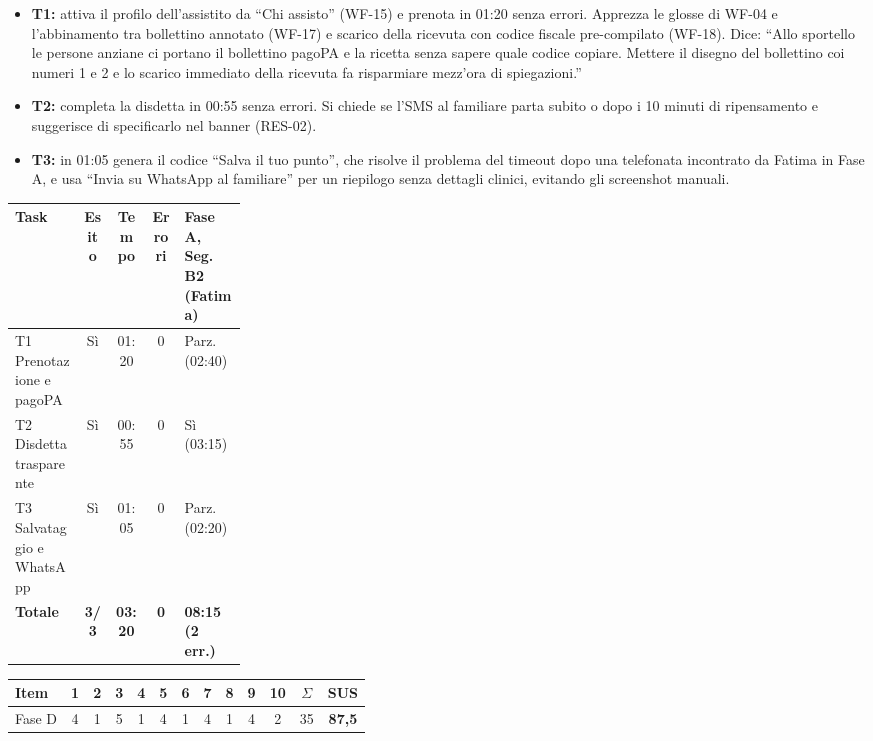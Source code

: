 
\begin{itemize}
\item \textbf{T1:} attiva il profilo dell'assistito da ``Chi assisto'' (WF-15) e prenota in 01:20 senza errori. Apprezza le glosse di WF-04 e l'abbinamento tra bollettino annotato (WF-17) e scarico della ricevuta con codice fiscale pre-compilato (WF-18). Dice: \enquote{Allo sportello le persone anziane ci portano il bollettino pagoPA e la ricetta senza sapere quale codice copiare. Mettere il disegno del bollettino coi numeri 1 e 2 e lo scarico immediato della ricevuta fa risparmiare mezz'ora di spiegazioni.}
\item \textbf{T2:} completa la disdetta in 00:55 senza errori. Si chiede se l'SMS al familiare parta subito o dopo i 10 minuti di ripensamento e suggerisce di specificarlo nel banner (RES-02).
\item \textbf{T3:} in 01:05 genera il codice ``Salva il tuo punto'', che risolve il problema del timeout dopo una telefonata incontrato da Fatima in Fase A, e usa ``Invia su WhatsApp al familiare'' per un riepilogo senza dettagli clinici, evitando gli screenshot manuali.
\end{itemize}

\begin{center}
\label{tab:d-test-laura}
\footnotesize
\begin{tabularx}{\linewidth}{@{}>{\raggedright\arraybackslash}X c c c >{\centering\arraybackslash}p{0.27\linewidth}@{}}
\toprule
\textbf{Task} & \textbf{Esito} & \textbf{Tempo} & \textbf{Errori} & \textbf{Fase A, Seg. B2 (Fatima)} \\
\midrule
T1 Prenotazione e pagoPA & Sì & 01:20 & 0 & Parz. (02:40) \\
T2 Disdetta trasparente & Sì & 00:55 & 0 & Sì (03:15) \\
T3 Salvataggio e WhatsApp & Sì & 01:05 & 0 & Parz. (02:20) \\
\midrule
\textbf{Totale} & \textbf{3/3} & \textbf{03:20} & \textbf{0} & \textbf{08:15 (2 err.)} \\
\bottomrule
\end{tabularx}
\end{center}

\begin{center}
\label{tab:d-sus-laura}
\footnotesize
\setlength{\tabcolsep}{3.5pt}
\begin{tabular}{@{}l *{10}{c} c c@{}}
\toprule
\textbf{Item} & \textbf{1} & \textbf{2} & \textbf{3} & \textbf{4} & \textbf{5} & \textbf{6} & \textbf{7} & \textbf{8} & \textbf{9} & \textbf{10} & $\Sigma$ & \textbf{SUS} \\
\midrule
Fase D & 4 & 1 & 5 & 1 & 4 & 1 & 4 & 1 & 4 & 2 & 35 & \textbf{87,5} \\
\bottomrule
\end{tabular}
\end{center}

